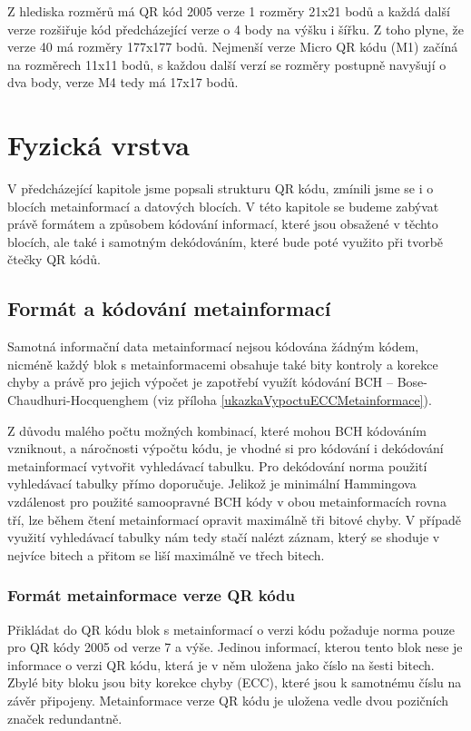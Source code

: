 Z hlediska rozměrů má QR kód 2005 verze 1 rozměry 21x21 bodů a každá další verze
rozšiřuje kód předcházející verze o 4 body na výšku i šířku. Z toho plyne, že
verze 40 má rozměry 177x177 bodů. Nejmenší verze Micro QR kódu (M1) začíná na
rozměrech 11x11 bodů, s každou další verzí se rozměry postupně navyšují o dva
body, verze M4 tedy má 17x17 bodů.


\section{Fyzická vrstva}
\label{fyzickaVrstva}

V předcházející kapitole jsme popsali strukturu QR kódu, zmínili jsme se i o
blocích metainformací a datových blocích. V této kapitole se budeme zabývat 
právě formátem a způsobem kódování informací, které jsou obsažené v těchto 
blocích, ale také i samotným dekódováním, které bude poté využito při tvorbě 
čtečky QR kódů.

\subsection{Formát a kódování metainformací}
\label{formatMetainformaci}

Samotná informační data metainformací nejsou kódována žádným kódem, nicméně 
každý blok s metainformacemi obsahuje také bity kontroly a korekce chyby a právě
pro jejich výpočet je zapotřebí využít kódování BCH --
Bose-Chaudhuri-Hocquenghem (viz příloha \ref{ukazkaVypoctuECCMetainformace}).

Z důvodu malého počtu možných kombinací, které mohou BCH kódováním vzniknout, a 
náročnosti výpočtu kódu, je vhodné si pro kódování i dekódování metainformací 
vytvořit vyhledávací tabulku. Pro dekódování norma použití vyhledávací tabulky 
přímo doporučuje. Jelikož je minimální Hammingova vzdálenost pro použité 
samoopravné BCH kódy v obou metainformacích rovna tří, lze během čtení 
metainformací opravit maximálně tři bitové chyby. V případě využití vyhledávací 
tabulky nám tedy stačí nalézt záznam, který se shoduje v nejvíce bitech a přitom
se liší maximálně ve třech bitech.


\subsubsection{Formát metainformace verze QR kódu}
\label{metainfoVersionEncoding}

Přikládat do QR kódu blok s metainformací o verzi kódu požaduje norma pouze pro
QR kódy 2005 od verze 7 a výše. Jedinou informací, kterou tento blok nese je 
informace o verzi QR kódu, která je v něm uložena jako číslo na šesti bitech. 
Zbylé bity bloku jsou bity korekce chyby (ECC), které jsou k samotnému číslu 
na závěr připojeny. Metainformace verze QR kódu je uložena vedle dvou pozičních 
značek redundantně.

